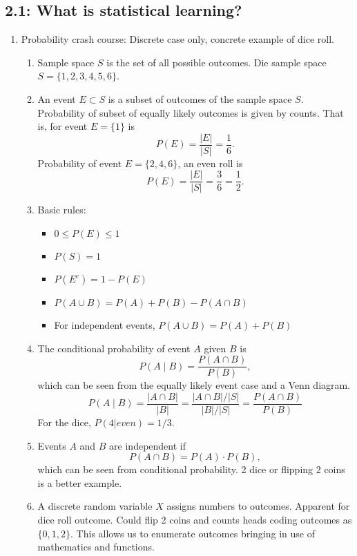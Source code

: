 \documentclass{article}
\begin{document}
\subsection*{2.1: What is statistical learning?}

\begin{enumerate}
\item Probability crash course: Discrete case only, concrete example of dice roll.

\begin{enumerate}
\item Sample space $S$ is the set of all possible outcomes. Die sample space $S=\{1,2,3,4,5,6\}$. 

\item An event $E \subset S$ is a subset of outcomes of the sample space $S$. Probability of subset of equally likely outcomes is given by counts. That is, for event $E=\{1\}$ is
\[
P(E)= \frac{|E|}{|S|} = \frac{1}{6}.
\]
Probability of event $E=\{2,4,6\}$, an even roll is
\[
P(E)= \frac{|E|}{|S|} = \frac{3}{6} = \frac{1}{2}.
\]

\item Basic rules:
\begin{itemize}
\item $0 \leq P(E) \leq 1$
\item $P(S)=1$
\item $P(E^c) = 1-P(E)$
\item $P(A \cup B) = P(A)+P(B)-P(A \cap B)$
\item For independent events, $P(A \cup B) = P(A)+P(B)$
\end{itemize}

\item The conditional probability of event $A$ given $B$ is
\[
P(A \mid B) = \frac{P(A \cap B)}{P(B)},
\]
which can be seen from the equally likely event case and a Venn diagram.
\[
P(A \mid B) = \frac{|A \cap B|}{|B|}  = \frac{|A \cap B|/|S|}{|B|/|S|}  = \frac{P(A \cap B)}{P(B)}
\]
For the dice, $P(4|even) = 1/3$.

\item Events $A$ and $B$ are independent if
\[
P(A \cap B) = P(A) \cdot P(B),
\]
which can be seen from conditional probability. 2 dice or flipping 2 coins is a better example.

\item A discrete random variable $X$ assigns numbers to outcomes. Apparent for dice roll outcome. Could flip 2 coins and counts heads coding outcomes as $\{0,1,2\}$. This allows us to enumerate outcomes bringing in use of mathematics and functions.


\end{enumerate}
\end{enumerate}
\end{document}
